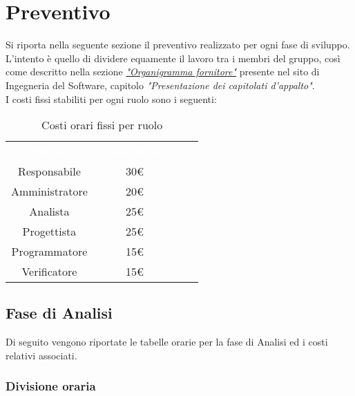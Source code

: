 \section{Preventivo}
Si riporta nella seguente sezione il preventivo realizzato per ogni fase
di sviluppo.\\
L'intento è quello di dividere equamente il lavoro tra i membri del gruppo,
così come descritto nella sezione \href{https://www.math.unipd.it/~tullio/IS-1/2021/Progetto/Capitolati.html}{\textit{"Organigramma fornitore"}}
presente nel sito di Ingegneria del Software, capitolo \textit{"Presentazione dei capitolati d'appalto"}.\\
\bigbreak
\noindent
I costi fissi stabiliti per ogni ruolo sono i seguenti:
\begin{table}[htb]
    \centering
    {\renewcommand{\arraystretch}{1.5}
    \begin{tabular}{cccc}
	    \rowcolor[RGB]{33, 73, 50}
	    \textcolor{white}{\textbf{Ruolo}} & \textcolor{white}{\textbf{Costo Orario}}\\
	    \rowcolor[RGB]{216, 235, 171}
	    Responsabile & 30€\\
	    \rowcolor[RGB]{233, 245, 206}
	    Amministratore & 20€\\
        \rowcolor[RGB]{216, 235, 171}
	    Analista & 25€\\
	    \rowcolor[RGB]{233, 245, 206}
	    Progettista & 25€\\
        \rowcolor[RGB]{216, 235, 171}
	    Programmatore & 15€\\
	    \rowcolor[RGB]{233, 245, 206}
	    Verificatore & 15€\\
    \end{tabular}	
}
\caption{Costi orari fissi per ruolo}
\end{table}

\subsection{Fase di Analisi}
Di seguito vengono riportate le tabelle orarie per la fase di Analisi ed i costi relativi associati.
\subsubsection{Divisione oraria}

